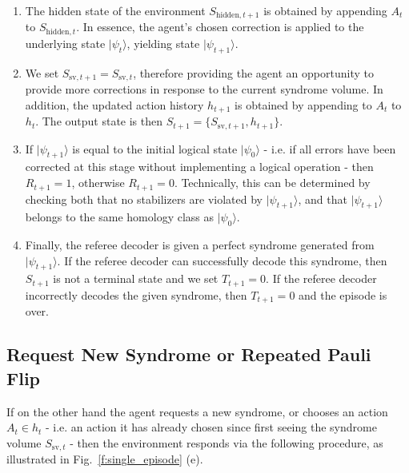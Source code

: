 \documentclass[twocolumn,preprintnumbers,amsmath,amssymb,notitlepage,nofootinbib,longbibliography,superscriptaddress,aps,pra,10pt]{revtex4-1}
\begin{document}
	\begin{enumerate}
		\item The hidden state of the environment $S_{\mathrm{hidden},t+1}$ is obtained by appending $A_t$ to $S_{\mathrm{hidden},t}$.
		In essence, the agent's chosen correction is applied to the  underlying state $|\psi_t\rangle$, yielding state $|\psi_{t+1}\rangle$.

		\item We set $S_{\mathrm{sv},t+1} = S_{\mathrm{sv},t}$, therefore providing the agent an opportunity to provide more corrections in response to the current syndrome volume.
		In addition, the updated action history $h_{t+1}$ is obtained by appending to $A_t$ to $h_t$.
		The output state is then $S_{t+1} = \{S_{\mathrm{sv},t+1},h_{t+1}\}$.

		\item If $|\psi_{t+1}\rangle$ is equal to the initial logical state $|\psi_0\rangle$ - i.e. if all errors have been corrected at this stage without implementing a logical operation - then $R_{t+1} = 1$, otherwise $R_{t+1} = 0$.
		Technically, this can be determined by checking both that no stabilizers are violated by $|\psi_{t+1}\rangle$, and that $|\psi_{t+1}\rangle$ belongs to the same homology class as $|\psi_0\rangle$.

		\item Finally, the referee decoder is given a perfect syndrome generated from $|\psi_{t+1}\rangle$.
		If the referee decoder can successfully decode this syndrome, then $S_{t+1}$ is not a terminal state and we set $T_{t+1} = 0$.
		If the referee decoder incorrectly decodes the given syndrome, then $T_{t+1} = 0$ and the episode is over.
	\end{enumerate}

	\subsection{Request New Syndrome or Repeated Pauli Flip}

	If on the other hand the agent requests a new syndrome, or chooses an action $A_t \in h_t$ - i.e. an action it has already chosen since first seeing the syndrome volume $S_{\mathrm{sv},t}$ - then the environment responds via the following procedure, as illustrated in Fig.~\ref{f:single_episode} (e).
\end{document}
